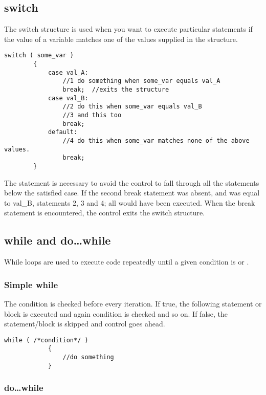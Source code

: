\documentclass{article}
\begin{document}
	\subsection{switch}

		The switch structure is used when you want to execute particular statements if the value of a variable matches one of the values supplied in the structure.

		\begin{lstlisting}[gobble=8]
		switch ( some_var )
		{
			case val_A:
				//1 do something when some_var equals val_A
				break;	//exits the structure
			case val_B:
				//2 do this when some_var equals val_B
				//3 and this too
				break;
			default:
				//4 do this when some_var matches none of the above values.
				break;
		}
		\end{lstlisting}

		The  statement is necessary to avoid the control to fall through all the statements below the satisfied case. If the second break statement was absent, and  was equal to val\_B, statements 2, 3 and 4; all would have been executed. When the break statement is encountered, the control exits the switch structure.

	\subsection{while and do\ldots while}

		While loops are used to execute code repeatedly until a given condition is  or .

		\subsubsection{Simple while}

			The condition is checked before every iteration. If true, the following statement or block is executed and again condition is checked and so on. If false, the statement/block is skipped and control goes ahead.

			\begin{lstlisting}[gobble=12]
			while ( /*condition*/ )
			{
				//do something
			}
			\end{lstlisting}

		\subsubsection{do\ldots while}
\end{document}
